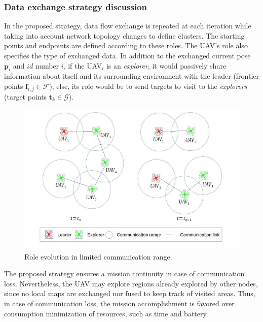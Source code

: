 \documentclass[11pt,openany]{book}
\begin{document}
\subsubsection{Data exchange strategy discussion}
In the proposed strategy, data ﬂow exchange is repeated at each iteration while taking into account network topology changes to deﬁne clusters. The starting points and endpoints are deﬁned according to these roles. The UAV’s role also speciﬁes the type of exchanged data. In addition to the exchanged current pose $\mathbf{p}_i$ and $id$ number $i$, if the UAV$_i$ is an \textit{explorer}, it would passively share information about itself and its surrounding environment with the leader (frontier points $\mathbf{f}_{i,j} \in \mathcal{F}$); else, its role would be to send targets to visit to the \textit{explorers} (target points $\mathbf{t}_k \in \mathcal{G}$).
\begin{figure}[H]
    \centering
    \includegraphics[scale=0.4]{assets/4_6.png}
    \caption{Role evolution in limited communication range.}
    \label{fig:4.6}
\end{figure}
The proposed strategy ensures a mission continuity in case of communication loss. Nevertheless, the UAV may explore regions already explored by other nodes, since no local maps are exchanged nor fused to keep track of visited areas. Thus, in case of communication loss, the mission accomplishment is favored over consumption minimization of resources, such as time and battery.
\end{document}

